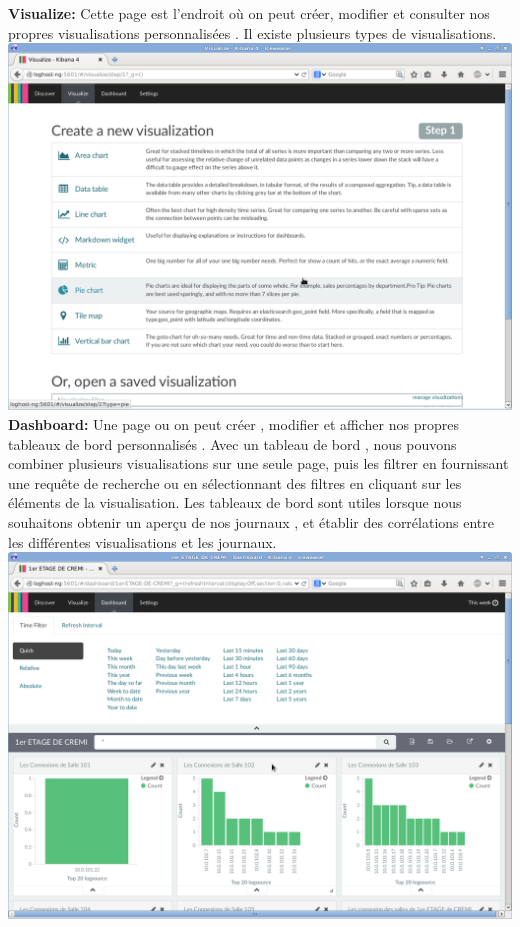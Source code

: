 \documentclass[11pt,a4paper]{article}
\begin{document}
\textbf{Visualize:} Cette page est l'endroit où on peut créer, modifier et consulter nos propres visualisations personnalisées . Il existe plusieurs types de visualisations.\\

\includegraphics[scale=0.3]{visualize.png} \\

\textbf{Dashboard:} Une page ou on peut créer , modifier et afficher nos propres tableaux de bord personnalisés . Avec un tableau de bord , nous pouvons combiner plusieurs visualisations sur une seule page, puis les filtrer en fournissant une requête de recherche ou en sélectionnant des filtres en cliquant sur les éléments de la visualisation. Les tableaux de bord sont utiles lorsque nous souhaitons obtenir un aperçu de nos journaux , et établir des corrélations entre les différentes visualisations et les journaux.\\

\includegraphics[scale=0.3]{dashboard.png} \\
\end{document}
